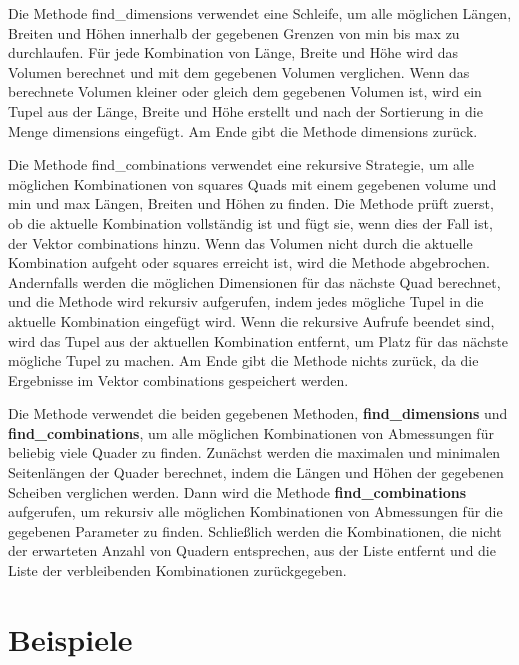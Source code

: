 \documentclass[a4paper,10pt,ngerman]{scrartcl}
\begin{document}
    Die Methode find\_dimensions verwendet eine Schleife, um alle möglichen Längen, Breiten und Höhen innerhalb der gegebenen Grenzen von min bis max zu durchlaufen.
    Für jede Kombination von Länge, Breite und Höhe wird das Volumen berechnet und mit dem gegebenen Volumen verglichen.
    Wenn das berechnete Volumen kleiner oder gleich dem gegebenen Volumen ist,
    wird ein Tupel aus der Länge, Breite und Höhe erstellt und nach der Sortierung in die Menge dimensions eingefügt.
    Am Ende gibt die Methode dimensions zurück.

    Die Methode find\_combinations verwendet eine rekursive Strategie,
    um alle möglichen Kombinationen von squares Quads mit einem gegebenen volume und min und max Längen, Breiten und Höhen zu finden.
    Die Methode prüft zuerst, ob die aktuelle Kombination vollständig ist und fügt sie, wenn dies der Fall ist, der Vektor combinations hinzu.
    Wenn das Volumen nicht durch die aktuelle Kombination aufgeht oder squares erreicht ist, wird die Methode abgebrochen.
    Andernfalls werden die möglichen Dimensionen für das nächste Quad berechnet, und die Methode wird rekursiv aufgerufen,
    indem jedes mögliche Tupel in die aktuelle Kombination eingefügt wird.
    Wenn die rekursive Aufrufe beendet sind, wird das Tupel aus der aktuellen Kombination entfernt, um Platz für das nächste mögliche Tupel zu machen.
    Am Ende gibt die Methode nichts zurück, da die Ergebnisse im Vektor combinations gespeichert werden.

    Die Methode verwendet die beiden gegebenen Methoden, \textbf{find\_dimensions} und \textbf{find\_combinations},
    um alle möglichen Kombinationen von Abmessungen für beliebig viele Quader zu finden.
    Zunächst werden die maximalen und minimalen Seitenlängen der Quader berechnet, indem die Längen und Höhen der gegebenen Scheiben verglichen werden.
    Dann wird die Methode \textbf{find\_combinations} aufgerufen, um rekursiv alle möglichen Kombinationen von Abmessungen für die gegebenen Parameter zu finden.
    Schließlich werden die Kombinationen, die nicht der erwarteten Anzahl von Quadern entsprechen, aus der Liste entfernt
    und die Liste der verbleibenden Kombinationen zurückgegeben.
    \newpage

    \section{Beispiele}\label{sec:beispiele}
\end{document}
